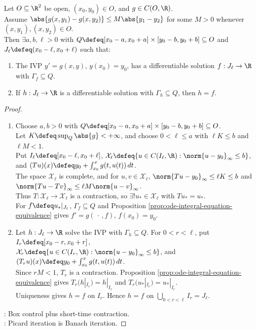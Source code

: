 \begin{theorem} \label{thm:picard-local-existence-uniqueness} \\
Let $O\subseteq\R^2$ be open, $(x_0,y_0)\in O$, and $g\in C(O,\R)$.\\
Assume $\abs{g(x,y_1)-g(x,y_2)}\leq M\abs{y_1-y_2}$ for some $M>0$ whenever $(x,y_1),(x,y_2)\in O$.\\
Then $\exists a,b,\ell>0$ with $Q\defeq[x_0-a,x_0+a]\times[y_0-b,y_0+b]\subseteq O$ and $J_\ell\defeq(x_0-\ell,x_0+\ell)$ such that:
\begin{enumerate}[label=(\roman*)]
\setlength{\itemsep}{0pt}
\item The IVP $y'=g(x,y)$, $y(x_0)=y_0$, has a differentiable solution $f:J_\ell\to\R$ with $\Gamma_f\subseteq Q$.
\item If $h:J_\ell\to\R$ is a differentiable solution with $\Gamma_h\subseteq Q$, then $h=f$.
\end{enumerate}
\begin{proof}
\begin{enumerate}[label=(\roman*)]
\setlength{\itemsep}{0pt}
\item Choose $a,b>0$ with $Q\defeq[x_0-a,x_0+a]\times[y_0-b,y_0+b]\subseteq O$.\\
Let $K\defeq\sup_Q\abs{g}<+\infty$, and choose $0<\ell\leq a$ with $\ell K\leq b$ and $\ell M<1$.\\
Put $I_\ell\defeq[x_0-\ell,x_0+\ell]$, $\mathcal{X}_\ell\defeq\{u\in C(I_\ell,\R):\norm{u-y_0}_\infty\leq b\}$, and $(Tu)(x)\defeq y_0+\int_{x_0}^{x}g(t,u(t))\,dt$.\\
The space $\mathcal{X}_\ell$ is complete, and for $u,v\in\mathcal{X}_\ell$, $\norm{Tu-y_0}_\infty\leq\ell K\leq b$ and $\norm{Tu-Tv}_\infty\leq\ell M\norm{u-v}_\infty$.\\
Thus $T:\mathcal{X}_\ell\to\mathcal{X}_\ell$ is a contraction, so $\exists!u_*\in\mathcal{X}_\ell$ with $Tu_*=u_*$.\\
For $f\defeq u_*|_{J_\ell}$, $\Gamma_f\subseteq Q$ and Proposition \ref{prop:ode-integral-equation-equivalence} gives $f'=g(\,\cdot\,,f)$, $f(x_0)=y_0$.
\item Let $h:J_\ell\to\R$ solve the IVP with $\Gamma_h\subseteq Q$. For $0<r<\ell$, put $I_r\defeq[x_0-r,x_0+r]$,\\
$\mathcal{X}_r\defeq\{u\in C(I_r,\R):\norm{u-y_0}_\infty\leq b\}$, and $(T_ru)(x)\defeq y_0+\int_{x_0}^{x}g(t,u(t))\,dt$.\\
Since $rM<1$, $T_r$ is a contraction. Proposition \ref{prop:ode-integral-equation-equivalence} gives $T_r(h|_{I_r})=h|_{I_r}$ and $T_r(u_*|_{I_r})=u_*|_{I_r}$.\\
Uniqueness gives $h=f$ on $I_r$. Hence $h=f$ on $\bigcup\limits_{0<r<\ell}I_r=J_\ell$.
\end{enumerate}
: Box control plus short-time contraction.\\
: Picard iteration is Banach iteration.
\end{proof}
\end{theorem}

